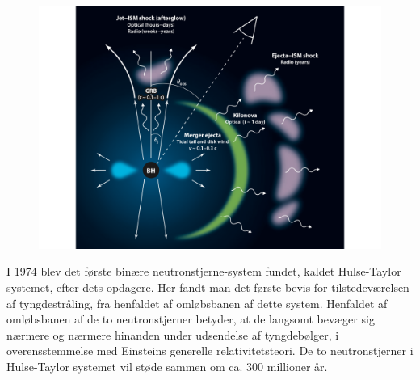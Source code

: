 \documentclass[twocolumn]{article}
\begin{document}
\begin{figure}
\includegraphics[width=\columnwidth]{KN_scematic_berger.pdf}
\end{figure}

I 1974 blev det første binære neutronstjerne-system fundet, kaldet Hulse-Taylor systemet, efter dets opdagere. Her fandt man det første bevis for tilstedeværelsen af tyngdestråling, fra henfaldet af omløbsbanen af dette system. %
Henfaldet af omløbsbanen af de to neutronstjerner betyder, at de langsomt bevæger sig nærmere og nærmere hinanden under udsendelse af tyngdebølger, i overensstemmelse med Einsteins generelle relativitetsteori. De to neutronstjerner i Hulse-Taylor systemet vil støde sammen om ca. 300 millioner år.  
\end{document}
